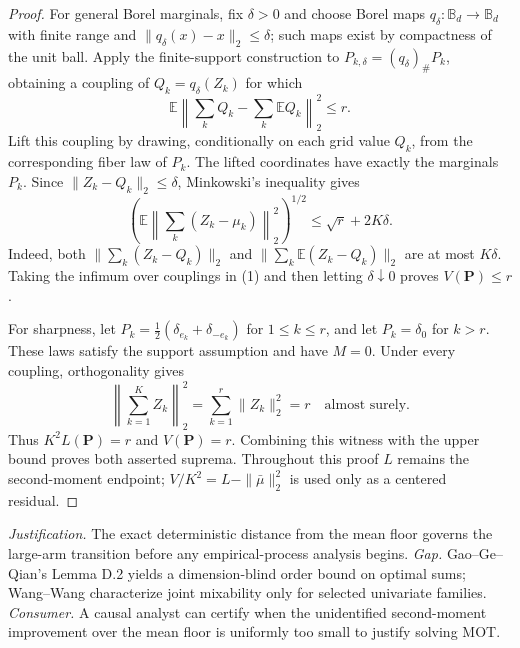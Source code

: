 \documentclass{article}
\begin{document}
\begin{proof}
For general Borel marginals, fix \(\delta>0\) and choose Borel maps \(q_\delta:\mathbb B_d\to\mathbb B_d\) with finite range and \(\|q_\delta(x)-x\|_2\le\delta\); such maps exist by compactness of the unit ball. Apply the finite-support construction to \(P_{k,\delta}=(q_\delta)_{\#}P_k\), obtaining a coupling of \(Q_k=q_\delta(Z_k)\) for which
\[
\mathbb E\left\|\sum_kQ_k-\sum_k\mathbb EQ_k\right\|_2^2\le r.
\]
Lift this coupling by drawing, conditionally on each grid value \(Q_k\), from the corresponding fiber law of \(P_k\). The lifted coordinates have exactly the marginals \(P_k\). Since \(\|Z_k-Q_k\|_2\le\delta\), Minkowski's inequality gives
\[
\left(\mathbb E\left\|\sum_k(Z_k-\mu_k)\right\|_2^2\right)^{1/2}
\le\sqrt r+2K\delta.
\]
Indeed, both \(\|\sum_k(Z_k-Q_k)\|_2\) and \(\|\sum_k\mathbb E(Z_k-Q_k)\|_2\) are at most \(K\delta\). Taking the infimum over couplings in (1) and then letting \(\delta\downarrow0\) proves \(V(\mathbf P)\le r\).

For sharpness, let \(P_k=\tfrac12(\delta_{e_k}+\delta_{-e_k})\) for \(1\le k\le r\), and let \(P_k=\delta_0\) for \(k>r\). These laws satisfy the support assumption and have \(M=0\). Under every coupling, orthogonality gives
\[
\left\|\sum_{k=1}^KZ_k\right\|_2^2=\sum_{k=1}^r\|Z_k\|_2^2=r
\quad\text{almost surely}.
\]
Thus \(K^2L(\mathbf P)=r\) and \(V(\mathbf P)=r\). Combining this witness with the upper bound proves both asserted suprema. Throughout this proof \(L\) remains the second-moment endpoint; \(V/K^2=L-\|\bar\mu\|_2^2\) is used only as a centered residual.
\end{proof}
\par\smallskip\noindent \textit{Justification.} The exact deterministic distance from the mean floor governs the large-arm transition before any empirical-process analysis begins. \textit{Gap.} Gao--Ge--Qian's Lemma D.2 yields a dimension-blind order bound on optimal sums; Wang--Wang characterize joint mixability only for selected univariate families. \textit{Consumer.} A causal analyst can certify when the unidentified second-moment improvement over the mean floor is uniformly too small to justify solving MOT.
\end{document}
